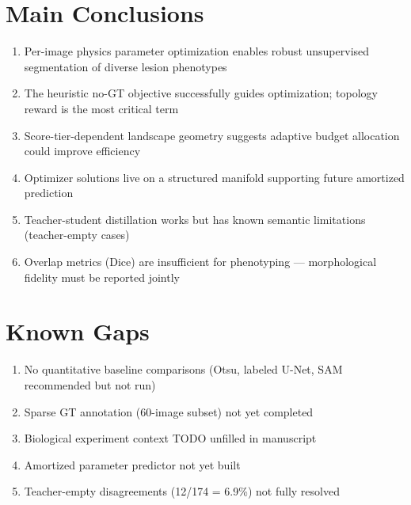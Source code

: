 \documentclass[11pt,a4paper]{article}
\begin{document}
\section{Main Conclusions}

\begin{enumerate}[nosep]
  \item Per-image physics parameter optimization enables robust unsupervised segmentation of diverse lesion phenotypes
  \item The heuristic no-GT objective successfully guides optimization; topology reward is the most critical term
  \item Score-tier-dependent landscape geometry suggests adaptive budget allocation could improve efficiency
  \item Optimizer solutions live on a structured manifold supporting future amortized prediction
  \item Teacher-student distillation works but has known semantic limitations (teacher-empty cases)
  \item Overlap metrics (Dice) are insufficient for phenotyping --- morphological fidelity must be reported jointly
\end{enumerate}

\section{Known Gaps}

\begin{enumerate}[nosep]
  \item No quantitative baseline comparisons (Otsu, labeled U-Net, SAM recommended but not run)
  \item Sparse GT annotation (60-image subset) not yet completed
  \item Biological experiment context TODO unfilled in manuscript
  \item Amortized parameter predictor not yet built
  \item Teacher-empty disagreements (12/174 = 6.9\%) not fully resolved
\end{enumerate}
\end{document}
